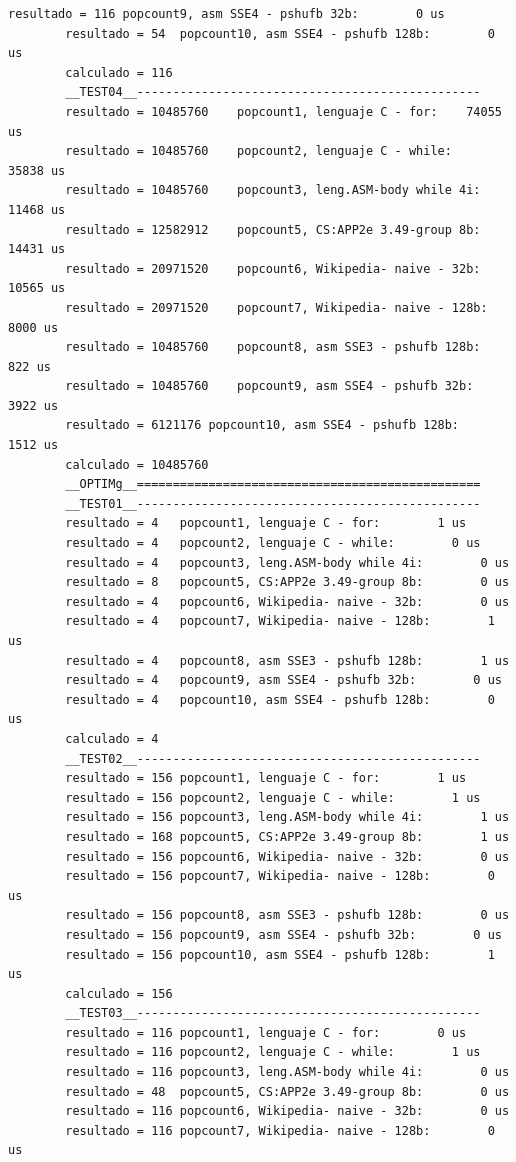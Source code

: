 \begin{lstlisting}[frame=single]
		resultado = 116	popcount9, asm SSE4 - pshufb 32b:        0 us
		resultado = 54	popcount10, asm SSE4 - pshufb 128b:        0 us
		calculado = 116
		__TEST04__------------------------------------------------
		resultado = 10485760	popcount1, lenguaje C - for:    74055 us
		resultado = 10485760	popcount2, lenguaje C - while:    35838 us
		resultado = 10485760	popcount3, leng.ASM-body while 4i:    11468 us
		resultado = 12582912	popcount5, CS:APP2e 3.49-group 8b:    14431 us
		resultado = 20971520	popcount6, Wikipedia- naive - 32b:    10565 us
		resultado = 20971520	popcount7, Wikipedia- naive - 128b:     8000 us
		resultado = 10485760	popcount8, asm SSE3 - pshufb 128b:      822 us
		resultado = 10485760	popcount9, asm SSE4 - pshufb 32b:     3922 us
		resultado = 6121176	popcount10, asm SSE4 - pshufb 128b:     1512 us
		calculado = 10485760
		__OPTIMg__================================================
		__TEST01__------------------------------------------------
		resultado = 4	popcount1, lenguaje C - for:        1 us
		resultado = 4	popcount2, lenguaje C - while:        0 us
		resultado = 4	popcount3, leng.ASM-body while 4i:        0 us
		resultado = 8	popcount5, CS:APP2e 3.49-group 8b:        0 us
		resultado = 4	popcount6, Wikipedia- naive - 32b:        0 us
		resultado = 4	popcount7, Wikipedia- naive - 128b:        1 us
		resultado = 4	popcount8, asm SSE3 - pshufb 128b:        1 us
		resultado = 4	popcount9, asm SSE4 - pshufb 32b:        0 us
		resultado = 4	popcount10, asm SSE4 - pshufb 128b:        0 us
		calculado = 4
		__TEST02__------------------------------------------------
		resultado = 156	popcount1, lenguaje C - for:        1 us
		resultado = 156	popcount2, lenguaje C - while:        1 us
		resultado = 156	popcount3, leng.ASM-body while 4i:        1 us
		resultado = 168	popcount5, CS:APP2e 3.49-group 8b:        1 us
		resultado = 156	popcount6, Wikipedia- naive - 32b:        0 us
		resultado = 156	popcount7, Wikipedia- naive - 128b:        0 us
		resultado = 156	popcount8, asm SSE3 - pshufb 128b:        0 us
		resultado = 156	popcount9, asm SSE4 - pshufb 32b:        0 us
		resultado = 156	popcount10, asm SSE4 - pshufb 128b:        1 us
		calculado = 156
		__TEST03__------------------------------------------------
		resultado = 116	popcount1, lenguaje C - for:        0 us
		resultado = 116	popcount2, lenguaje C - while:        1 us
		resultado = 116	popcount3, leng.ASM-body while 4i:        0 us
		resultado = 48	popcount5, CS:APP2e 3.49-group 8b:        0 us
		resultado = 116	popcount6, Wikipedia- naive - 32b:        0 us
		resultado = 116	popcount7, Wikipedia- naive - 128b:        0 us

\end{lstlisting}
